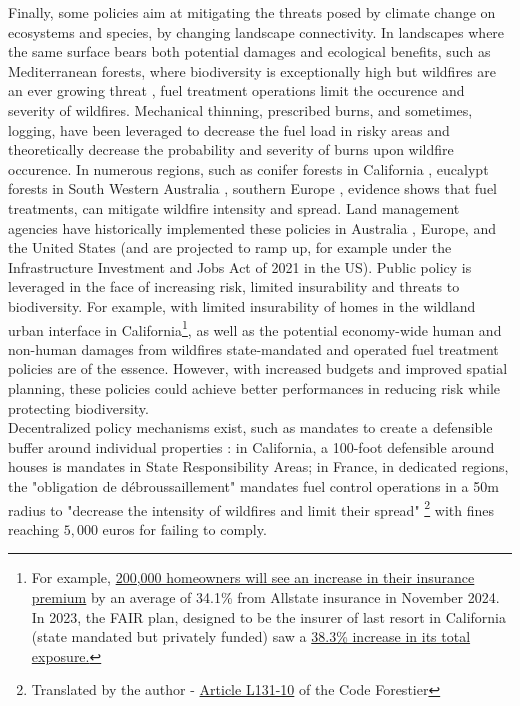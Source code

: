 Finally, some policies aim at mitigating the threats posed by climate change on ecosystems and species, by changing landscape connectivity. In landscapes where the same surface bears both potential damages and ecological benefits, such as Mediterranean forests, where biodiversity is exceptionally high but wildfires are an ever growing threat \citep{Dupuy2019ClimateCI, wasserman_climate_2023}, fuel treatment operations limit the occurence and severity of wildfires.  Mechanical thinning, prescribed burns, and sometimes, logging, have been leveraged to decrease the fuel load in risky areas and theoretically decrease the probability and severity of burns upon wildfire occurence. In numerous regions, such as conifer forests in California \citep{Vaillant2009, Kalies2016, low_shaded_2023}, eucalypt forests in South Western Australia \citep{burrows2013, boer_long-term_2009, Florec2020}, southern Europe \citep{Fernandes2013}, evidence shows that fuel treatments, can mitigate wildfire intensity and spread. Land management agencies have historically implemented these policies in Australia \citep{burrows2013}, Europe, and the United States (and are projected to ramp up, for example under the Infrastructure Investment and Jobs Act of 2021 in the US). Public policy is leveraged in the face of increasing risk, limited insurability and threats to biodiversity. For example, with limited insurability of homes in the wildland urban interface in California\footnote{For example, \href{https://www.washingtonpost.com/climate-environment/2024/08/29/california-insurance-wildfires-allstate/}{200,000 homeowners will see an increase in their insurance premium} by an average of 34.1\% from Allstate insurance in November 2024. In 2023, the FAIR plan, designed to be the insurer of last resort in California (state mandated but privately funded) saw a \href{https://www.cfpnet.com/key-statistics-data/}{38.3\% increase in its total exposure.}}, as well as the potential economy-wide human and non-human damages from wildfires \citep{wang_economic_2021, heft-neal_behavior_2023, Ayars2023} state-mandated and operated fuel treatment policies are of the essence. However, with increased budgets and improved spatial planning, these policies could achieve better performances in reducing risk while protecting biodiversity.\\
Decentralized policy mechanisms exist, such as mandates to create a defensible buffer around individual properties : in California, a 100-foot defensible around houses is mandates in State Responsibility Areas;  in France, in dedicated regions, the "obligation de débroussaillement" mandates fuel control operations in a 50m radius to "decrease the intensity of wildfires and limit their spread"
\footnote{Translated by the author - \href{https://www.legifrance.gouv.fr/codes/article_lc/LEGIARTI000047809197}{Article L131-10} of the Code Forestier} with fines reaching $5,000$ euros for failing to comply.


